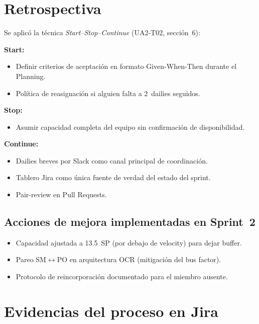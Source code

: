 \documentclass[11pt,a4paper]{article}
\begin{document}
\section{Retrospectiva}

Se aplicó la técnica \emph{Start--Stop--Continue} (UA2-T02, sección~6):

\textbf{Start:}
\begin{itemize}
\item Definir criterios de aceptación en formato Given-When-Then durante el Planning.
\item Política de reasignación si alguien falta a 2~dailies seguidos.
\end{itemize}

\textbf{Stop:}
\begin{itemize}
\item Asumir capacidad completa del equipo sin confirmación de disponibilidad.
\end{itemize}

\textbf{Continue:}
\begin{itemize}
\item Dailies breves por Slack como canal principal de coordinación.
\item Tablero Jira como única fuente de verdad del estado del sprint.
\item Pair-review en Pull Requests.
\end{itemize}

\subsection{Acciones de mejora implementadas en Sprint~2}
\begin{itemize}
\item Capacidad ajustada a 13.5~SP (por debajo de velocity) para dejar buffer.
\item Pareo SM$\leftrightarrow$PO en arquitectura OCR (mitigación del bus factor).
\item Protocolo de reincorporación documentado para el miembro ausente.
\end{itemize}

\section{Evidencias del proceso en Jira}
\end{document}
